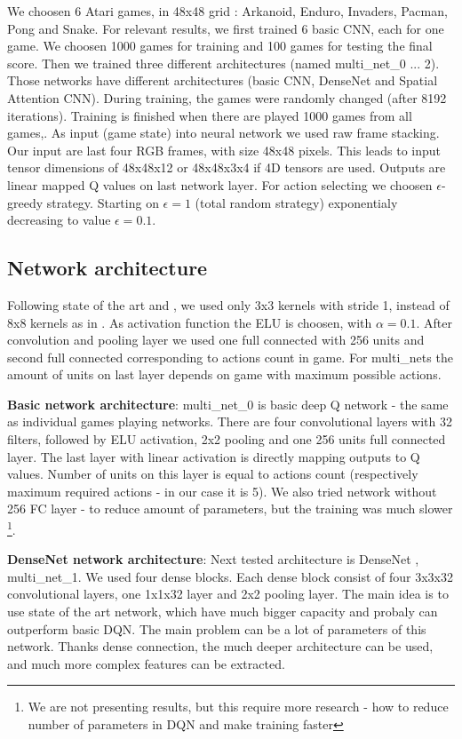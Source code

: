 \documentclass[10pt,a4paper]{article}
\begin{document}
We choosen 6 Atari games, in 48x48 grid : Arkanoid, Enduro, Invaders, Pacman, Pong and Snake.
For relevant results, we first trained 6 basic CNN, each for one game. We choosen 1000 games for training and 100 games for testing the final score.
Then we trained three different architectures (named multi\_net\_0 ... 2). Those networks have different architectures (basic CNN, DenseNet and Spatial Attention CNN).
During training, the games were randomly changed (after 8192 iterations). Training is finished when there are played 1000 games from all games,.
As input (game state) into neural network we used raw frame stacking. Our input are last four RGB frames, with size 48x48 pixels. This leads to input tensor dimensions of 48x48x12 or 48x48x3x4 if
4D tensors are used. Outputs are linear mapped Q values on last network layer.
For action selecting we choosen $\epsilon$-greedy strategy. Starting on $\epsilon = 1$ (total random strategy) exponentialy decreasing to value $\epsilon = 0.1$.

\subsection {Network architecture}
Following state of the art \cite{bib:vgg_net} and \cite{bib:resnet_net}, we used only 3x3 kernels with stride 1, instead of 8x8 kernels as in \cite{bib:dqn_atari}.
As activation function the ELU is choosen, with $\alpha = 0.1$. After convolution and pooling layer we used one full connected with 256 units and second
full connected corresponding to actions count in game. For multi\_nets the amount of units on last layer depends on game with maximum possible actions.

{\bf Basic network architecture}:
multi\_net\_0 is basic deep Q network - the same as individual games playing networks.
There are four convolutional layers with 32 filters, followed by ELU activation, 2x2 pooling and one 256 units full connected layer.
The last layer with linear activation is directly mapping outputs to Q values. Number of units on this layer is equal to actions count
(respectively maximum required actions - in our case it is 5).
We also tried network without 256 FC layer - to reduce amount of parameters, but the training was much slower \footnote {We are not presenting results, but this require more research - how to reduce number of parameters in DQN and make training faster}.

{\bf DenseNet network architecture}:
Next tested architecture is DenseNet \cite{bib:densenet_net}, multi\_net\_1. We used four dense blocks. Each dense block consist of four 3x3x32 convolutional layers, one 1x1x32 layer and 2x2 pooling layer.
The main idea is to use state of the art network, which have much bigger capacity and probaly can outperform basic DQN. The main problem can be a lot
of parameters of this network. Thanks dense connection, the much deeper architecture can be used, and much more complex features can be extracted.
\end{document}

